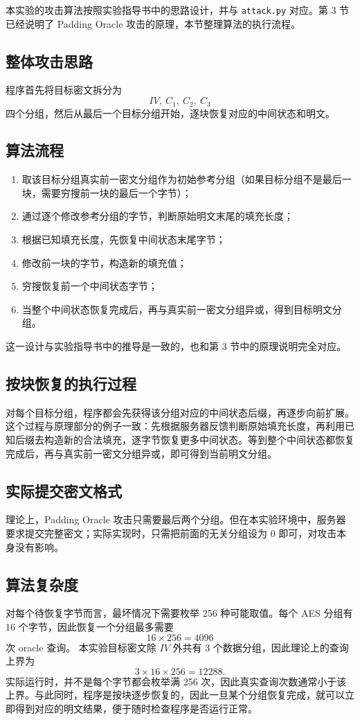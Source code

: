本实验的攻击算法按照实验指导书中的思路设计，并与 \verb|attack.py| 对应。第 3 节已经说明了 Padding Oracle 攻击的原理，本节整理算法的执行流程。

\subsection{整体攻击思路}

程序首先将目标密文拆分为
\[
    IV,\ C_1,\ C_2,\ C_3
\]
四个分组，然后从最后一个目标分组开始，逐块恢复对应的中间状态和明文。

\subsection{算法流程}

\begin{enumerate}
    \item 取该目标分组真实前一密文分组作为初始参考分组（如果目标分组不是最后一块，需要穷搜前一块的最后一个字节）；
    \item 通过逐个修改参考分组的字节，判断原始明文末尾的填充长度；
    \item 根据已知填充长度，先恢复中间状态末尾字节；
    \item 修改前一块的字节，构造新的填充值；
    \item 穷搜恢复前一个中间状态字节；
    \item 当整个中间状态恢复完成后，再与真实前一密文分组异或，得到目标明文分组。
\end{enumerate}

这一设计与实验指导书中的推导是一致的，也和第 3 节中的原理说明完全对应。

\subsection{按块恢复的执行过程}

对每个目标分组，程序都会先获得该分组对应的中间状态后缀，再逐步向前扩展。这个过程与原理部分的例子一致：先根据服务器反馈判断原始填充长度，再利用已知后缀去构造新的合法填充，逐字节恢复更多中间状态。等到整个中间状态都恢复完成后，再与真实前一密文分组异或，即可得到当前明文分组。

\subsection{实际提交密文格式}

理论上，Padding Oracle 攻击只需要最后两个分组。但在本实验环境中，服务器要求提交完整密文；实际实现时，只需把前面的无关分组设为 0 即可，对攻击本身没有影响。

\subsection{算法复杂度}

对每个待恢复字节而言，最坏情况下需要枚举 256 种可能取值。每个 AES 分组有 16 个字节，因此恢复一个分组最多需要
\[
    16 \times 256 = 4096
\]
次 oracle 查询。
本实验目标密文除 $IV$ 外共有 3 个数据分组，因此理论上的查询上界为
\[
    3 \times 16 \times 256 = 12288.
\]
实际运行时，并不是每个字节都会枚举满 256 次，因此真实查询次数通常小于该上界。与此同时，程序是按块逐步恢复的，因此一旦某个分组恢复完成，就可以立即得到对应的明文结果，便于随时检查程序是否运行正常。
